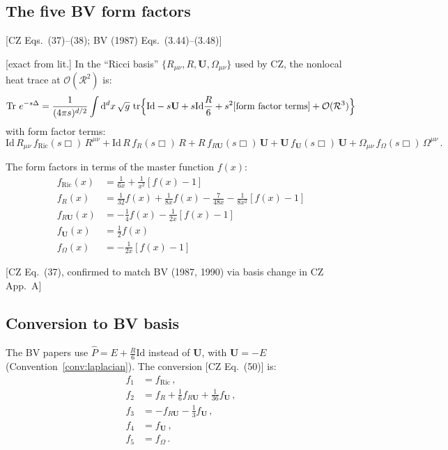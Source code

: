 \documentclass[12pt,a4paper]{article}
\theoremstyle{definition}
\theoremstyle{remark}
\newcommand{\Tr}{\operatorname{Tr}}
\newcommand{\tr}{\operatorname{tr}}
\newcommand{\dd}{\mathrm{d}}
\newcommand{\Id}{\mathrm{Id}}
\newcommand{\fromlit}[1]{\textcolor{blue!70!black}{\textsf{[#1]}}}
\newcommand{\exactlit}{\textcolor{blue!60!black}{\textsf{[exact from lit.]}}}
\begin{document}
\subsection{The five BV form factors}

\fromlit{CZ Eqs.~(37)--(38); BV (1987) Eqs.~(3.44)--(3.48)}

\exactlit\;
In the ``Ricci basis'' $\{R_{\mu\nu}, R, \mathbf{U}, \Omega_{\mu\nu}\}$
used by CZ, the nonlocal heat trace at $\mathcal{O}(\mathcal{R}^2)$ is:
\begin{equation}
  \Tr\,e^{-s\Delta}
  = \frac{1}{(4\pi s)^{d/2}}
  \int\dd^d x\,\sqrt{g}\,\tr\Bigl\{
  \Id - s\mathbf{U} + s\Id\frac{R}{6}
  + s^2[\text{form factor terms}]
  + \mathcal{O}(\mathcal{R}^3)
  \Bigr\}
  \label{eq:CZ-heat-trace}
\end{equation}
with form factor terms:
\begin{equation}
  \Id\,R_{\mu\nu}\,f_{\text{Ric}}(s\Box)\,R^{\mu\nu}
  + \Id\,R\,f_R(s\Box)\,R
  + R\,f_{R\mathbf{U}}(s\Box)\,\mathbf{U}
  + \mathbf{U}\,f_\mathbf{U}(s\Box)\,\mathbf{U}
  + \Omega_{\mu\nu}\,f_\Omega(s\Box)\,\Omega^{\mu\nu}\,.
\end{equation}

The form factors in terms of the master function $f(x)$:
\begin{equation}
  \boxed{
  \begin{aligned}
  f_{\text{Ric}}(x)
    &= \frac{1}{6x} + \frac{1}{x^2}[f(x)-1]\\[4pt]
  f_R(x)
    &= \frac{1}{32}f(x) + \frac{1}{8x}f(x) - \frac{7}{48x}
       - \frac{1}{8x^2}[f(x)-1]\\[4pt]
  f_{R\mathbf{U}}(x)
    &= -\frac{1}{4}f(x) - \frac{1}{2x}[f(x)-1]\\[4pt]
  f_\mathbf{U}(x)
    &= \frac{1}{2}f(x)\\[4pt]
  f_\Omega(x)
    &= -\frac{1}{2x}[f(x)-1]
  \end{aligned}
  }
  \label{eq:CZ-form-factors}
\end{equation}

\fromlit{CZ Eq.~(37), confirmed to match BV (1987, 1990) via
basis change in CZ App.~A}


\subsection{Conversion to BV basis}

The BV papers use $\hat{P} = E + \frac{R}{6}\Id$ instead of $\mathbf{U}$,
with $\mathbf{U} = -E$ (Convention~\ref{conv:laplacian}).
The conversion \fromlit{CZ Eq.~(50)} is:
\begin{equation}
  \boxed{
  \begin{aligned}
  f_1 &= f_{\text{Ric}}\,,\\
  f_2 &= f_R + \frac{1}{6}f_{R\mathbf{U}} + \frac{1}{36}f_\mathbf{U}\,,\\
  f_3 &= -f_{R\mathbf{U}} - \frac{1}{3}f_\mathbf{U}\,,\\
  f_4 &= f_\mathbf{U}\,,\\
  f_5 &= f_\Omega\,.
  \end{aligned}
  }
  \label{eq:BV-conversion}
\end{equation}
\end{document}
